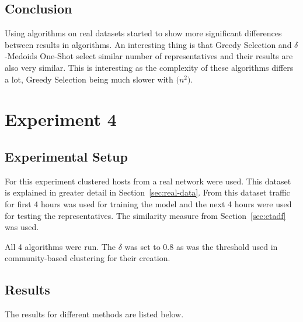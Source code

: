 \documentclass[thesis=B,english]{FITthesis}[2012/10/20]
\begin{document}
\subsection{Conclusion}
Using algorithms on real datasets started to show more significant differences between results in algorithms.
An interesting thing is that Greedy Selection and $\delta$-Medoids One-Shot select similar number of representatives and their results are also very similar.
This is interesting as the complexity of these algorithms differs a lot, Greedy Selection being much slower with $\mathcal(n^2)$. 

\section{Experiment 4}\label{sec:exp4}


\subsection{Experimental Setup}
For this experiment clustered hosts from a real network were used.
This dataset is explained in greater detail in Section~\ref{sec:real-data}.
From this dataset traffic for first 4 hours was used for training the model and the next 4 hours were used for testing the representatives.
The similarity measure from Section~\ref{sec:ctadf} was used.

All 4 algorithms were run.
The $\delta$ was set to 0.8 as was the threshold used in community-based clustering for their creation.

\subsection{Results}

The results for different methods are listed below.
\end{document}

